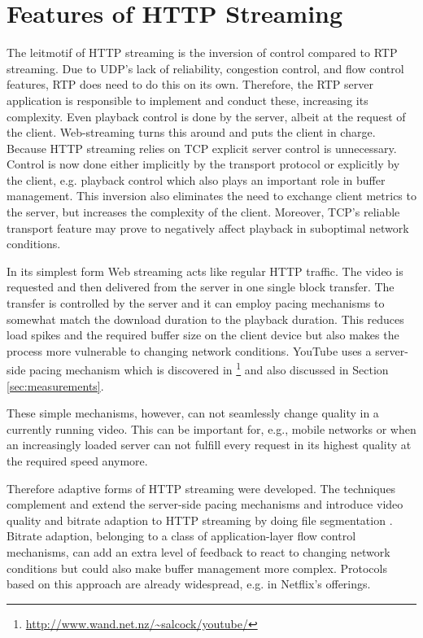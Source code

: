 \section{Features of HTTP Streaming}
\label{sec:featureshttpstreaming}

The leitmotif of HTTP streaming is the inversion of control compared to RTP streaming. Due to UDP's lack of reliability, congestion control, and flow control features, RTP does need to do this on its own. Therefore, the RTP server application is responsible to implement and conduct these, increasing its complexity. Even playback control is done by the server, albeit at the request of the client. Web-streaming turns this around and puts the client in charge. Because HTTP streaming relies on TCP explicit server control is unnecessary. Control is now done either implicitly by the transport protocol or explicitly by the client, e.g. playback control which also plays an important role in buffer management. This inversion also eliminates the need to exchange client metrics to the server, but increases the complexity of the client. Moreover, TCP's reliable transport feature may prove to negatively affect playback in suboptimal network conditions.



In its simplest form Web streaming acts like regular HTTP traffic. The video is requested and then delivered from the server in one single block transfer. The transfer is controlled by the server and it can employ pacing mechanisms to somewhat match the download duration to the playback duration. This reduces load spikes and the required buffer size on the client device but also makes the process more vulnerable to changing network conditions. YouTube uses a server-side pacing mechanism which is  discovered in \cite{alcock2011afcyt}\footnote{\url{http://www.wand.net.nz/~salcock/youtube/}} and also discussed in Section \ref{sec:measurements}.

These simple mechanisms, however, can not seamlessly change quality in a currently running video. This can be important for, e.g., mobile networks or when an increasingly loaded server can not fulfill every request in its highest quality at the required speed anymore.

Therefore adaptive forms of HTTP streaming were developed. The techniques complement and extend the server-side pacing mechanisms and introduce video quality and bitrate adaption to HTTP streaming by doing file segmentation \cite{ma2011mobile, watching-video1}. Bitrate adaption, belonging to a class of application-layer flow control mechanisms, can add an extra level of feedback to react to changing network conditions but could also make buffer management more complex. Protocols based on this approach are already widespread, e.g. in Netflix's offerings.





